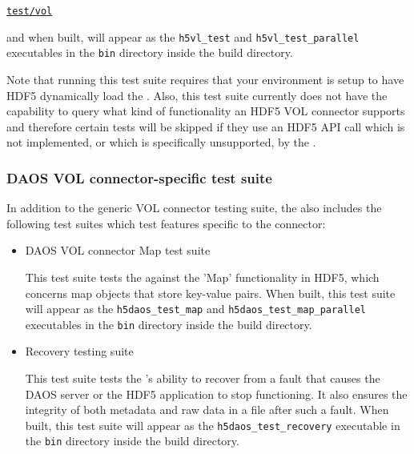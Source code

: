 \documentclass[../users_guide.tex]{subfiles}
\begin{document}
\href{https://bitbucket.hdfgroup.org/projects/HDF5VOL/repos/daos-vol/browse/test}{\texttt{test/vol}}

and when built, will appear as the \texttt{h5vl\_test} and \texttt{h5vl\_test\_parallel} executables in the \texttt{bin} directory inside the build directory.

Note that running this test suite requires that your environment is setup to have HDF5 dynamically load the \dvc{}. Also, this test suite currently does not have the capability to query what kind of functionality an HDF5 VOL connector supports and therefore certain tests will be skipped if they use an HDF5 API call which is not implemented, or which is specifically unsupported, by the \dvc.

\subsubsection{DAOS VOL connector-specific test suite}

In addition to the generic VOL connector testing suite, the \dvc{} also includes the following test suites which test features specific to the connector:

\begin{itemize}
    \item DAOS VOL connector Map test suite

    This test suite tests the \dvc{} against the 'Map' functionality in HDF5, which concerns map objects that store key-value pairs. When built, this test suite will appear as the \texttt{h5daos\_test\_map} and \texttt{h5daos\_test\_map\_parallel} executables in the \texttt{bin} directory inside the build directory.

    \item \dvc{} Recovery testing suite

    This test suite tests the \dvc's ability to recover from a fault that causes the DAOS server or the HDF5 application to stop functioning. It also ensures the integrity of both metadata and raw data in a file after such a fault. When built, this test suite will appear as the \texttt{h5daos\_test\_recovery} executable in the \texttt{bin} directory inside the build directory.
\end{itemize}
\end{document}
